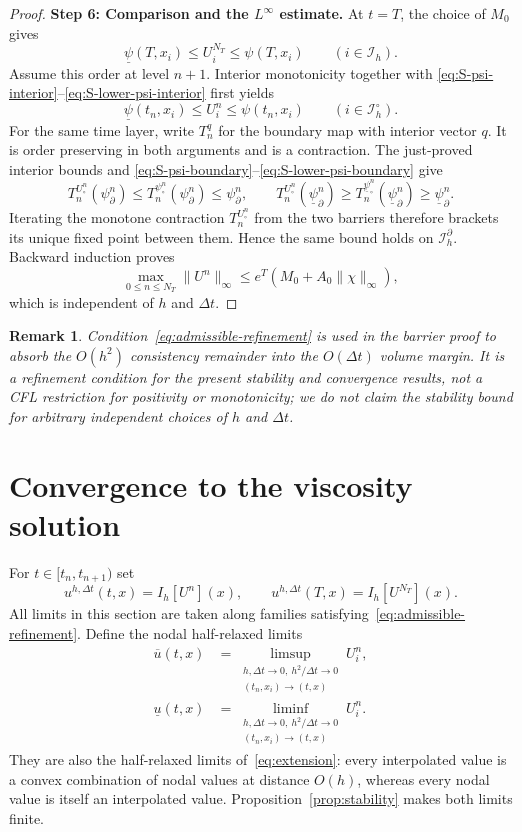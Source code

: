 \documentclass[10pt,a4paper]{amsart}
\newtheorem{remark}[theorem]{Remark}
\newcommand{\dt}{\Delta t}
\begin{document}
\begin{proof}
		\medskip
		\noindent\textbf{Step 6: Comparison and the $L^\infty$ estimate.}
		At $t=T$, the choice of $M_0$ gives
		\[
		\underline\psi(T,x_i)\le U_i^{N_T}\le\psi(T,x_i)
		\qquad(i\in\mathcal I_h).
		\]
		Assume this order at level $n+1$.  Interior monotonicity together with
		\eqref{eq:S-psi-interior}--\eqref{eq:S-lower-psi-interior} first yields
		\[
		\underline\psi(t_n,x_i)\le U_i^n\le\psi(t_n,x_i)
		\qquad(i\in\mathcal I_h^\circ).
		\]
		For the same time layer, write $T_n^q$ for the boundary map with interior
		vector $q$.  It is order preserving in both arguments and is a contraction.
		The just-proved interior bounds and
		\eqref{eq:S-psi-boundary}--\eqref{eq:S-lower-psi-boundary} give
		\[
		T_n^{U_\circ^n}(\psi_\partial^n)
		\le T_n^{\psi_\circ^n}(\psi_\partial^n)\le\psi_\partial^n,
		\qquad
		T_n^{U_\circ^n}(\underline\psi_\partial^n)
		\ge T_n^{\underline\psi_\circ^n}(\underline\psi_\partial^n)
		\ge\underline\psi_\partial^n.
		\]
		Iterating the monotone contraction $T_n^{U_\circ^n}$ from the two barriers
		therefore brackets its unique fixed point between them.  Hence the same bound
		holds on $\mathcal I_h^\partial$.  Backward induction proves
		\[
		\max_{0\le n\le N_T}\|U^n\|_\infty
		\le e^T(M_0+A_0\|\chi\|_\infty),
		\]
		which is independent of $h$ and $\Delta t$.
	\end{proof}
	\begin{remark}\upshape
		Condition~\eqref{eq:admissible-refinement} is used in the barrier proof to
		absorb the $O(h^2)$ consistency remainder into the $O(\Delta t)$ volume
		margin.  It is a refinement condition for the present stability and
		convergence results, not a CFL restriction for positivity or monotonicity;
		we do not claim the stability bound for arbitrary independent choices of
		$h$ and $\Delta t$.
	\end{remark}
	\section{Convergence to the viscosity solution}
	\label{sec:convergence}
	
	For $t\in[t_n,t_{n+1})$ set
	\begin{equation}
		u^{h,\dt}(t,x)=I_h[U^n](x),
		\qquad
		u^{h,\dt}(T,x)=I_h[U^{N_T}](x).
		\label{eq:extension}
	\end{equation}
	All limits in this section are taken along families satisfying~\eqref{eq:admissible-refinement}.  Define the nodal half-relaxed limits
	\begin{align}
		\overline u(t,x)
		&=\limsup_{\substack{h,\dt\to0,\ h^2/\dt\to0\\
				(t_n,x_i)\to(t,x)}}U_i^n,
		\label{eq:upper-relaxed}\\
		\underline u(t,x)
		&=\liminf_{\substack{h,\dt\to0,\ h^2/\dt\to0\\
				(t_n,x_i)\to(t,x)}}U_i^n.
		\label{eq:lower-relaxed}
	\end{align}
	They are also the half-relaxed limits of~\eqref{eq:extension}: every interpolated value is a convex combination of nodal values at distance $O(h)$, whereas every nodal value is itself an interpolated value.  Proposition~\ref{prop:stability} makes both limits finite.
	
\end{document}
